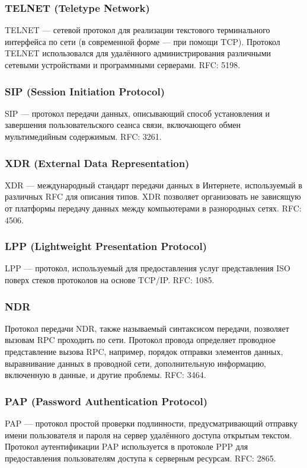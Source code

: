 \subsubsection{TELNET (Teletype Network)}
TELNET — сетевой протокол для реализации текстового терминального интерфейса по
сети (в современной форме — при помощи TCP). Протокол TELNET использовался для
удалённого администрирования различными сетевыми устройствами и программными
серверами. RFC: 5198.

\subsubsection{SIP (Session Initiation Protocol)}
SIP — протокол передачи данных, описывающий способ установления и завершения
пользовательского сеанса связи, включающего обмен мультимедийным содержимым.
RFC: 3261.

\subsubsection{XDR (External Data Representation)}
XDR — международный стандарт передачи данных в Интернете, используемый в различных
RFC для описания типов. XDR позволяет организовать не зависящую от платформы передачу
данных между компьютерами в разнородных сетях. RFC: 4506.

\subsubsection{LPP (Lightweight Presentation Protocol)}
LPP — протокол, используемый для предоставления услуг представления ISO поверх
стеков протоколов на основе TCP/IP. RFC: 1085.

\subsubsection{NDR}
Протокол передачи NDR, также называемый синтаксисом передачи, позволяет вызовам
RPC проходить по сети. Протокол провода определяет проводное представление вызова RPC,
например, порядок отправки элементов данных, выравнивание данных в проводной сети,
дополнительную информацию, включенную в данные, и другие проблемы. RFC: 3464.

\subsubsection{PAP (Password Authentication Protocol)}
PAP — протокол простой проверки подлинности, предусматривающий отправку имени
пользователя и пароля на сервер удалённого доступа открытым текстом. Протокол
аутентификации PAP используется в протоколе PPP для предоставления пользователям
доступа к серверным ресурсам. RFC: 2865.

